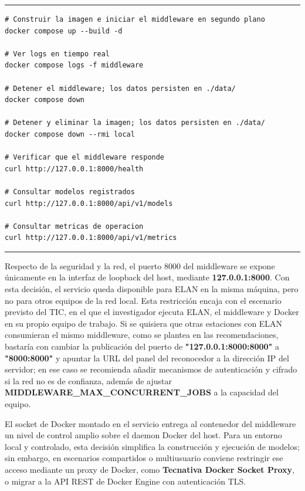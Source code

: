 \begin{center}
\begin{minipage}{0.90\textwidth}
\hrule
\vspace{0.06cm}
\scriptsize
\begin{Verbatim}[baselinestretch=0.72]
# Construir la imagen e iniciar el middleware en segundo plano
docker compose up --build -d

# Ver logs en tiempo real
docker compose logs -f middleware

# Detener el middleware; los datos persisten en ./data/
docker compose down

# Detener y eliminar la imagen; los datos persisten en ./data/
docker compose down --rmi local

# Verificar que el middleware responde
curl http://127.0.0.1:8000/health

# Consultar modelos registrados
curl http://127.0.0.1:8000/api/v1/models

# Consultar metricas de operacion
curl http://127.0.0.1:8000/api/v1/metrics
\end{Verbatim}
\vspace{0.03cm}
\hrule

\label{fig:compose_cmds}
\end{minipage}
\end{center}

Respecto de la seguridad y la red, el puerto 8000 del middleware se expone únicamente en la interfaz de loopback del host, mediante \textbf{127.0.0.1:8000}. Con esta decisión, el servicio queda disponible para ELAN en la misma máquina, pero no para otros equipos de la red local. Esta restricción encaja con el escenario previsto del TIC, en el que el investigador ejecuta ELAN, el middleware y Docker en su propio equipo de trabajo. Si se quisiera que otras estaciones con ELAN consumieran el mismo middleware, como se plantea en las recomendaciones, bastaría con cambiar la publicación del puerto de \textbf{"127.0.0.1:8000:8000"} a \textbf{"8000:8000"} y apuntar la URL del panel del reconocedor a la dirección IP del servidor; en ese caso se recomienda añadir mecanismos de autenticación y cifrado si la red no es de confianza, además de ajustar \textbf{MIDDLEWARE\_MAX\_CONCURRENT\_JOBS} a la capacidad del equipo.

El socket de Docker montado en el servicio entrega al contenedor del middleware un nivel de control amplio sobre el daemon Docker del host. Para un entorno local y controlado, esta decisión simplifica la construcción y ejecución de modelos; sin embargo, en escenarios compartidos o multiusuario conviene restringir ese acceso mediante un proxy de Docker, como \textbf{Tecnativa Docker Socket Proxy}, o migrar a la API REST de Docker Engine con autenticación TLS.

